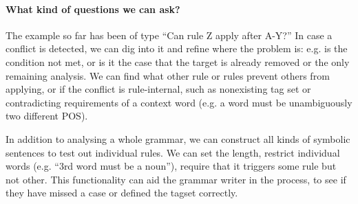 
\paragraph{What kind of questions we can ask?}

The example so far has been of type ``Can rule Z apply after A-Y?''
In case a conflict is detected, we can dig into it and refine where the problem is: e.g. is the condition not met, or is it the case that the target is already removed or the only remaining analysis.
We can find what other rule or rules prevent others from applying, or if the conflict is rule-internal, such as nonexisting tag set or contradicting requirements of a context word (e.g. a word must be unambiguously two different POS).


In addition to analysing a whole grammar, 
we can construct all kinds of symbolic sentences to test out individual rules. 
We can set the length, restrict individual words (e.g. ``3rd word must be a noun''), require that it triggers some rule but not other. 
This functionality can aid the grammar writer in the process, to see if they have missed a case or defined the tagset correctly.






